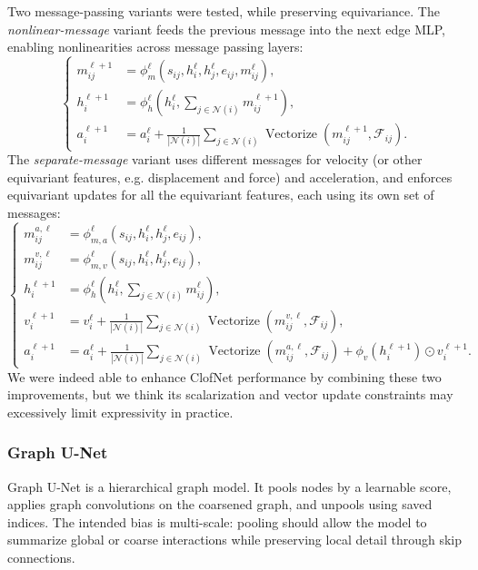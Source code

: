 \documentclass[11pt,a4paper,reqno]{amsart}
\theoremstyle{definition}
\theoremstyle{remark}
\numberwithin{equation}{section}
\newcommand{\Vectorize}{\operatorname{Vectorize}}
\begin{document}
Two message-passing variants were tested, while preserving equivariance. The \emph{nonlinear-message} variant feeds the previous message into the next edge MLP, enabling nonlinearities across message passing layers:
\begin{equation}
\left\{
\begin{aligned}
    m_{ij}^{\ell+1}&=\phi_m^\ell(s_{ij},h_i^\ell,h_j^\ell,e_{ij},m_{ij}^{\ell}),\\
    h_i^{\ell+1}&=\phi_h^\ell\left(h_i^\ell,\sum_{j\in\mathcal N(i)}m_{ij}^{\ell+1}\right),\\
    a_i^{\ell+1}&=a_i^\ell+\frac{1}{|\mathcal N(i)|}\sum_{j\in\mathcal N(i)}
    \Vectorize(m_{ij}^{\ell+1},\mathcal F_{ij}).
\end{aligned}
\right.
\label{eq:clofnet-nonlinear}
\end{equation}
The \emph{separate-message} variant uses different messages for velocity (or other equivariant features, e.g. displacement and force) and acceleration, and enforces equivariant updates for all the equivariant features, each using its own set of messages:
\begin{equation}
\left\{
\begin{aligned}
    m_{ij}^{a,\ell} &= \phi_{m,a}^\ell(s_{ij},h_i^\ell,h_j^\ell,e_{ij}), \\
    m_{ij}^{v,\ell} &= \phi_{m,v}^\ell(s_{ij},h_i^\ell,h_j^\ell,e_{ij}),\\
    h_i^{\ell+1}&=\phi_h^\ell\left(h_i^\ell,\sum_{j\in\mathcal N(i)}m_{ij}^{\ell}\right),\\
    v_i^{\ell+1}&=v_i^\ell+\frac{1}{|\mathcal N(i)|}\sum_{j\in\mathcal N(i)}\Vectorize(m_{ij}^{v,\ell},\mathcal F_{ij}),\\
    a_i^{\ell+1}&=a_i^\ell+\frac{1}{|\mathcal N(i)|}\sum_{j\in\mathcal N(i)}\Vectorize(m_{ij}^{a,\ell},\mathcal F_{ij})
        +\phi_v(h_i^{\ell+1})\odot v_i^{\ell+1}.
\end{aligned}
\right.
\label{eq:clofnet-separate}
\end{equation}
We were indeed able to enhance ClofNet performance by combining these two improvements, but we think its scalarization and vector update constraints may excessively limit expressivity in practice.

\subsubsection{Graph U-Net}

Graph U-Net is a hierarchical graph model. It pools nodes by a learnable score, applies graph convolutions on the coarsened graph, and unpools using saved indices. The intended bias is multi-scale: pooling should allow the model to summarize global or coarse interactions while preserving local detail through skip connections.
\end{document}
